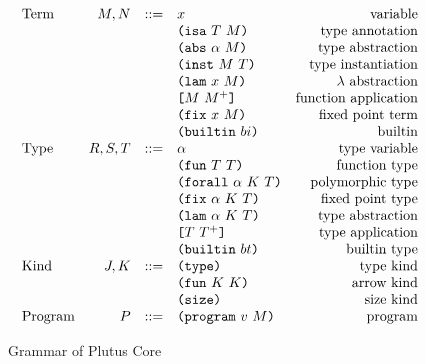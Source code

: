 \documentclass[../main.tex]{subfiles}
\begin{document}
\begin{figure*}[t]
    \centering
    \[\begin{array}{lrclr}
        \textrm{Term}             & M, N  & ::= & x                          & \textrm{variable}\\
                                  &       &     & \ann{M}{T}                 & \textrm{type annotation}\\
                                  &       &     & \abs{\alpha}{M}            & \textrm{type abstraction}\\
                                  &       &     & \inst{M}{T}                & \textrm{type instantiation}\\
                                  &       &     & \lam{x}{M}                 & \textrm{$\lambda$ abstraction}\\
                                  &       &     & \app{M}{M^+}               & \textrm{function application}\\
                                  &       &     & \fix{x}{M}                 & \textrm{fixed point term}\\
                                  &       &     & \builtin{bi}               & \textrm{builtin}\\
        \textrm{Type}             & R,S,T & ::= & \alpha                     & \textrm{type variable}\\
                                  &       &     & \funT{T}{T}                & \textrm{function type}\\
                                  &       &     & \forallT{\alpha}{K}{T}     & \textrm{polymorphic type}\\
                                  &       &     & \fixT{\alpha}{K}{T}        & \textrm{fixed point type}\\
                                  &       &     & \lamT{\alpha}{K}{T}        & \textrm{type abstraction}\\
                                  &       &     & \appT{T}{T^+}              & \textrm{type application}\\
                                  &       &     & \builtinT{bt}              & \textrm{builtin type}\\
        \textrm{Kind}             & J,K   & ::= & \typeK{}                   & \textrm{type kind}\\
                                  &       &     & \funK{K}{K}                & \textrm{arrow kind}\\
                                  &       &     & \sizeK{}                   & \textrm{size kind}\\
        \textrm{Program}          & P     & ::= & \program{v}{M}             & \textrm{program}\\

    \end{array}\]
    \caption{Grammar of Plutus Core}
    \label{fig:Plutus_core_grammar}
\end{figure*}
\end{document}
